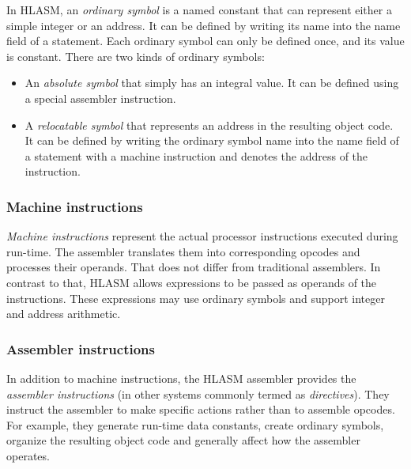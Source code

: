 In HLASM, an \emph{ordinary symbol} is a named constant that can represent either a simple integer or an address. It can be defined by writing its name into the name field of a statement. Each ordinary symbol can only be defined once, and its value is constant. There are two kinds of ordinary symbols:
\begin{itemize}
	\item An \emph{absolute symbol} that simply has an integral value. It can be defined using a special assembler instruction.
	\item A \emph{relocatable symbol} that represents an address in the resulting object code. It can be defined by writing the ordinary symbol name into the name field of a statement with a machine instruction and denotes the address of the instruction.
\end{itemize}

\subsubsection{Machine instructions}
\label{mach_instr}

\emph{Machine instructions} represent the actual processor instructions executed during run-time. The assembler translates them into corresponding opcodes and processes their operands. That does not differ from traditional assemblers. In contrast to that, HLASM allows expressions to be passed as operands of the instructions. These expressions may use ordinary symbols and support integer and address arithmetic.

\subsubsection{Assembler instructions}
\label{asm_instrs}

In addition to machine instructions, the HLASM assembler provides the \emph{assembler instructions} (in other systems commonly termed as \emph{directives}). They instruct the assembler to make specific actions rather than to assemble opcodes. For example, they generate run-time data constants, create ordinary symbols, organize the resulting object code and generally affect how the assembler operates.

